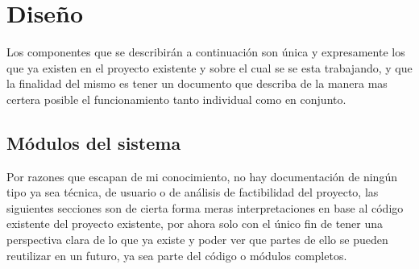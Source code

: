 \documentclass[12pt]{article} %
\begin{document}
	
\section{Diseño}
	Los componentes que se describirán a continuación son única y expresamente los que ya existen en el proyecto existente y sobre el cual se 
    se esta trabajando, y que la finalidad del mismo es tener un documento que describa de la manera mas certera posible el funcionamiento 
    tanto individual como en conjunto.
    
    \subsection{Módulos del sistema}
    	Por razones que escapan de mi conocimiento, no hay documentación de ningún tipo ya sea técnica, de usuario o de análisis de factibilidad
        del proyecto, las siguientes secciones son de cierta forma meras interpretaciones en base al código existente del proyecto existente, por
        ahora solo con el único fin de tener una perspectiva clara de lo que ya existe y poder ver que partes de ello se pueden reutilizar en un
        futuro, ya sea parte del código o módulos completos.
        
\end{document}

